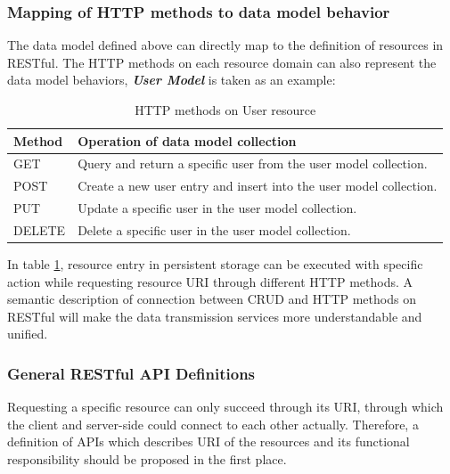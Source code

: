\subsubsection{ Mapping of HTTP methods to data model behavior}
The data model defined above can directly map to the definition of resources in RESTful. The HTTP methods on each resource domain can also represent the data model behaviors, \textbf{\textit{User Model}} is taken as an example: 
\begin{table}[!htbp]
\centering
\begin{tabularx}{\textwidth}{@{}lX@{}}
\toprule
Method        & {Operation of data model collection }                            \\ \midrule
GET           & {Query and return a specific user from the user model collection.}   \\
POST          & {Create a new user entry and insert into the user model collection.} \\
PUT           & {Update a specific user in the user model collection.}               \\
DELETE        & {Delete a specific user in the user model collection.}               \\ \bottomrule
\end{tabularx}
\caption{HTTP methods on User resource}
\label{table:http-method-on-user-resource}
\end{table}

In table \ref{table:http-method-on-user-resource}, resource entry in persistent storage can be executed with specific action while requesting resource URI through different HTTP methods. A semantic description of connection between \gls{CRUD} and HTTP methods on RESTful will make the data transmission services more understandable and unified\cite{brandon2008software}.

\subsubsection{ General RESTful API Definitions }

Requesting a specific resource can only succeed through its \gls{URI}, through which the client and server-side could connect to each other actually. Therefore, a definition of APIs which describes \gls{URI} of the resources and its functional responsibility should be proposed in the first place.


